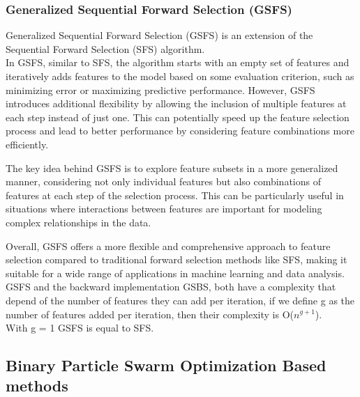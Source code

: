 \documentclass{Configuration_Files/PoliMi3i_thesis}
\begin{document}
\subsubsection{Generalized Sequential Forward Selection (GSFS) }

Generalized Sequential Forward Selection (GSFS) is an extension of the Sequential Forward Selection (SFS) algorithm. \\
In GSFS, similar to SFS, the algorithm starts with an empty set of features and iteratively adds features to the model based on some evaluation criterion, such as minimizing error or maximizing predictive performance. However, GSFS introduces additional flexibility by allowing the inclusion of multiple features at each step instead of just one. This can potentially speed up the feature selection process and lead to better performance by considering feature combinations more efficiently.

The key idea behind GSFS is to explore feature subsets in a more generalized manner, considering not only individual features but also combinations of features at each step of the selection process. This can be particularly useful in situations where interactions between features are important for modeling complex relationships in the data.

Overall, GSFS offers a more flexible and comprehensive approach to feature selection compared to traditional forward selection methods like SFS, making it suitable for a wide range of applications in machine learning and data analysis. \cite{radmanGeneralizedSequentialForward2019}
GSFS and the backward implementation GSBS, both have a complexity that depend of the number of features they can add per iteration, if we define g as the number of features added per iteration, then their complexity is O($n^{g+1}$). \\
 With g = 1 GSFS is equal to SFS.

\subsection{Binary Particle Swarm Optimization Based methods}
\end{document}
